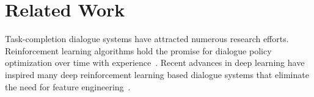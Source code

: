 \documentclass[11pt,letterpaper]{article}
\begin{document}


\section{Related Work}
Task-completion dialogue systems have attracted numerous research efforts. Reinforcement learning algorithms hold the promise for dialogue policy optimization over time with experience~\cite{DBLP:conf/icassp/SchefflerY00,DBLP:journals/taslp/LevinPE00,DBLP:journals/pieee/YoungGTW13,williams2017hybrid}. Recent advances in deep learning have inspired many deep reinforcement learning based dialogue systems that eliminate the need for feature engineering~\cite{su2016continuously,cuayahuitl2017simpleds,williams2017hybrid,Dhingra17EndToEnd,li2017end}.
\end{document}
